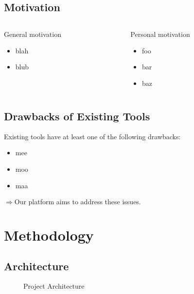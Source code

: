 \documentclass[
    USenglish,
    accentcolor=9c,
    fontsize= 12pt,
    a4paper,
    aspectratio=169,
    colorback=true,
    fancy_row_colors,
    leqno,
    fleqn,
    boxarc=3pt,
    fleqn,
    main,
    design=2008, %
]{algoslides}
\begin{document}
    \subsection{Motivation}
    \begin{frame}
        \slidehead{}
        \begin{columns}
            \begin{column}{.5\textwidth}
                General motivation
                \begin{itemize}
                    \item blah
                    \item blub
                \end{itemize}
            \end{column}
            \begin{column}{.5\textwidth}
                Personal motivation
                \begin{itemize}
                    \item foo
                    \item bar
                    \item baz
                \end{itemize}
            \end{column}
        \end{columns}
    \end{frame}

    \subsection{Drawbacks of Existing Tools}
    \begin{frame}
        \slidehead{}
        Existing tools have at least one of the following drawbacks:
        \begin{itemize}
            \item mee
            \item moo
            \item maa
        \end{itemize}

        $\Rightarrow$Our platform aims to address these issues.
    \end{frame}

    \section{Methodology}
    \subsection{Architecture}
    \begin{frame}[c]
        \slidehead{}\vspace{-1em}
        \begin{figure}
            \centering
            
            \caption{Project Architecture}
            \label{fig:project-architecture}
        \end{figure}
    \end{frame}
\end{document}
